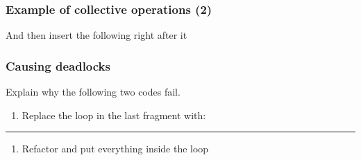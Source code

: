 \subsubsection{Example of collective operations
(2)}\label{example-of-collective-operations-2}

And then insert the following right after it

\begin{Shaded}
\begin{Highlighting}[]

       \NormalTok{(} 
           
             
          \NormalTok{\}}
      \NormalTok{\}}
\end{Highlighting}
\end{Shaded}

\subsubsection{Causing deadlocks}\label{causing-deadlocks}

Explain why the following two codes fail.

\begin{enumerate}
\def\labelenumi{\arabic{enumi}.}
\itemsep1pt\parskip0pt
\item
  Replace the loop in the last fragment with:
\end{enumerate}

\begin{Shaded}
\begin{Highlighting}[]
 \NormalTok{(} 
\end{Highlighting}
\end{Shaded}

\begin{center}\rule{3in}{0.4pt}\end{center}

\begin{enumerate}
\def\labelenumi{\arabic{enumi}.}
\setcounter{enumi}{1}
\itemsep1pt\parskip0pt
\item
  Refactor and put everything inside the loop
\end{enumerate}

